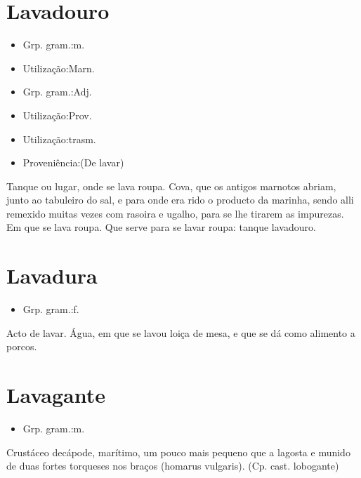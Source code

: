\section{Lavadouro}
\begin{itemize}
\item {Grp. gram.:m.}
\end{itemize}
\begin{itemize}
\item {Utilização:Marn.}
\end{itemize}
\begin{itemize}
\item {Grp. gram.:Adj.}
\end{itemize}
\begin{itemize}
\item {Utilização:Prov.}
\end{itemize}
\begin{itemize}
\item {Utilização:trasm.}
\end{itemize}
\begin{itemize}
\item {Proveniência:(De \textunderscore lavar\textunderscore )}
\end{itemize}
Tanque ou lugar, onde se lava roupa.
Cova, que os antigos marnotos abriam, junto ao tabuleiro do sal, e para onde era rido o producto da marinha, sendo alli remexido muitas vezes com rasoira e ugalho, para se lhe tirarem as impurezas.
Em que se lava roupa.
Que serve para se lavar roupa: \textunderscore tanque lavadouro\textunderscore .
\section{Lavadura}
\begin{itemize}
\item {Grp. gram.:f.}
\end{itemize}
Acto de lavar.
Água, em que se lavou loiça de mesa, e que se dá como alimento a porcos.
\section{Lavagante}
\begin{itemize}
\item {Grp. gram.:m.}
\end{itemize}
Crustáceo decápode, marítimo, um pouco mais pequeno que a lagosta e munido de duas fortes torqueses nos braços (\textunderscore homarus vulgaris\textunderscore ).
(Cp. cast. \textunderscore lobogante\textunderscore )
